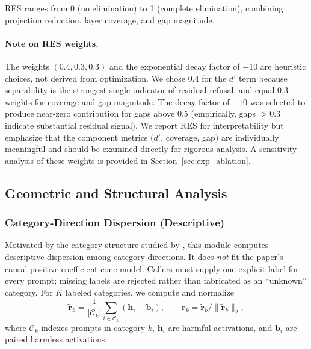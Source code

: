 \documentclass[11pt]{article}
\begin{document}
RES ranges from 0 (no elimination) to 1 (complete elimination), combining projection reduction, layer coverage, and gap magnitude.

\paragraph{Note on RES weights.} The weights $(0.4, 0.3, 0.3)$ and the exponential decay factor of $-10$ are heuristic choices, not derived from optimization. We chose 0.4 for the $d'$ term because separability is the strongest single indicator of residual refusal, and equal 0.3 weights for coverage and gap magnitude. The decay factor of $-10$ was selected to produce near-zero contribution for gaps above 0.5 (empirically, gaps $> 0.3$ indicate substantial residual signal). We report RES for interpretability but emphasize that the component metrics ($d'$, coverage, gap) are individually meaningful and should be examined directly for rigorous analysis. A sensitivity analysis of these weights is provided in Section~\ref{sec:exp_ablation}.

\subsection{Geometric and Structural Analysis}

\subsubsection{Category-Direction Dispersion (Descriptive)}
\label{sec:concept_cones}

Motivated by the category structure studied by \citet{wollschlager2025geometry}, this module computes descriptive dispersion among category directions. It does \emph{not} fit the paper's causal positive-coefficient cone model. Callers must supply one explicit label for every prompt; missing labels are rejected rather than fabricated as an ``unknown'' category. For $K$ labeled categories, we compute and normalize
\begin{equation}
    \widetilde{\mathbf{r}}_k = \frac{1}{|\mathcal{C}_k|}\sum_{i \in \mathcal{C}_k} (\mathbf{h}_i-\mathbf{b}_i), \qquad
    \mathbf{r}_k=\widetilde{\mathbf{r}}_k/\|\widetilde{\mathbf{r}}_k\|_2,
\end{equation}
where $\mathcal{C}_k$ indexes prompts in category $k$, $\mathbf{h}_i$ are harmful activations, and $\mathbf{b}_i$ are paired harmless activations.
\end{document}

